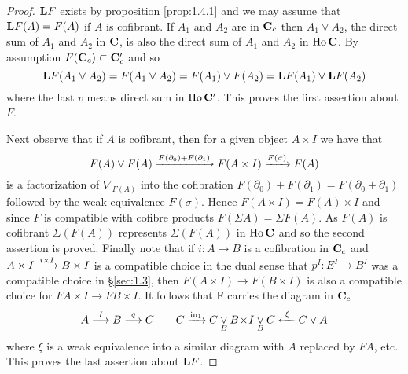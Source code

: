 \documentclass[../main]{subfiles}
\begin{document}
\begin{proof}
    $\mathbf{L} F$ exists by proposition \ref{prop:1.4.1} and we may assume that $\mathbf{L} F(A)=F(A)$ if $A$ is cofibrant. If $A_1$ and $A_2$ are in $\mathbf{C}_c$ then $A_1\vee A_2$, the direct sum of $A_1$ and $A_2$ in $\mathbf{C}$, is also the direct sum of $A_1$ and $A_2$ in $\operatorname{Ho} \mathbf{C}$. By assumption $F(\mathbf{C}_c)\subset\mathbf{C}'_c$ and so 
    \[\mathbf{L} F(A_1\vee A_2)= F(A_1\vee A_2)=F(A_1)\vee F(A_2) = \mathbf{L} F(A_1)\vee \mathbf{L} F(A_2)\] 
    where the last $v$ means direct sum in $\operatorname{Ho}\mathbf{C}'$. This proves the first assertion about $F$.
    
    Next observe that if $A$ is cofibrant, then for a given object $A\times I$ we have that 
    \[F(A)\vee F(A)\varrightarrow{F(\partial_0)+F(\partial_1)} F(A\times I)\varrightarrow{F(\sigma)}F(A)\]
    is a factorization of $\nabla_{F(A)}$ into the cofibration $F(\partial_0)+F(\partial_1) = F(\partial_0+\partial_1)$ followed by the weak equivalence $F(\sigma)$. Hence $F(A\times I)=F(A)\times I$ and since $F$ is compatible with cofibre products $F(\Sigma A) = \Sigma F(A)$. As $F(A)$ is cofibrant $\Sigma(F(A))$ represents $\Sigma(F(A))$ in $\operatorname{Ho}\mathbf{C}$ and so the second assertion is proved. Finally note that if $i:A\longrightarrow B$ is a cofibration in $\mathbf{C}_c$ and $A\times I\varrightarrow{i\times I}B\times I$ is a compatible choice in the dual sense that $p^I:E^I\longrightarrow B^I$ was a compatible choice in \S\ref{sec:1.3}, then $F(A\times I)\longrightarrow F(B\times I)$ is also a compatible choice for $FA\times I\longrightarrow FB\times I$. It follows that F carries the diagram in $\mathbf{C}_c$
    \[A\varrightarrow{I}B\varrightarrow{q}C\quad\quad C\varrightarrow{\In_1}C\underset{B}{\vee} B\!\times\! I\underset{B}{\vee} C\xleftarrow{\,\,\xi\,\,}C\vee A\]
    where $\xi$ is a weak equivalence into a similar diagram with $A$ replaced by $FA$, etc. This proves the last assertion about $\mathbf{L} F$.
\end{proof}
\end{document}
